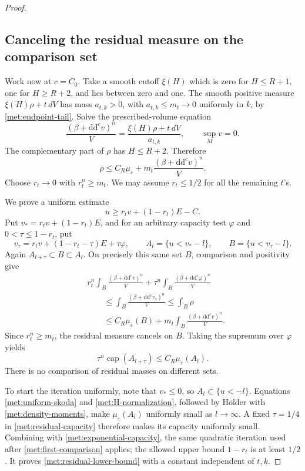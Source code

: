 \documentclass[11pt,letterpaper]{article}
\newcommand{\ddc}{\mathrm{d}\mathrm{d}^{c}}
\theoremstyle{definition}
\theoremstyle{remark}
\begin{document}
\begin{proof}
\subsection*{Canceling the residual measure on the comparison set}

Work now at \(c=C_0\).  Take a smooth cutoff \(\xi(H)\) which is zero
for \(H\leq R+1\), one for \(H\geq R+2\), and lies between zero
and one.  The smooth positive measure
\(\xi(H)\rho+t\,dV\) has mass \(a_{t,k}>0\), with
\(a_{t,k}\leq m_t\to0\) uniformly in \(k\), by
\eqref{met:endpoint-tail}.  Solve the prescribed-volume equation
\cite{YauCalabi}
\[
 \frac{(\beta+\ddc v)^n}{V}
     =\frac{\xi(H)\rho+t\,dV}{a_{t,k}},
 \qquad \sup_Mv=0.
\]
The complementary part of \(\rho\) has \(H\leq R+2\).  Therefore
\begin{equation}
 \label{met:residual-domination}
 \rho\leq C_R\mu_\varepsilon
       +m_t\frac{(\beta+\ddc v)^n}{V}.
\end{equation}
Choose \(r_t\to0\) with \(r_t^n\geq m_t\).  We may assume
\(r_t\leq1/2\) for all the remaining \(t\)'s.

We prove a uniform estimate
\begin{equation}
 \label{met:residual-lower-bound}
 u\geq r_tv+(1-r_t)E-C.
\end{equation}
Put \(v_*=r_tv+(1-r_t)E\), and for an arbitrary capacity test
\(\varphi\) and \(0<\tau\leq1-r_t\), put
\[
 v_\tau=r_tv+(1-r_t-\tau)E+\tau\varphi,
 \qquad A_l=\{u<v_*-l\},
 \qquad B=\{u<v_\tau-l\}.
\]
Again \(A_{l+\tau}\subset B\subset A_l\).  On precisely this
same set \(B\), comparison and positivity give
\begin{align*}
 &r_t^n\int_B\frac{(\beta+\ddc v)^n}{V}
 +\tau^n\int_B\frac{(\beta+\ddc\varphi)^n}{V}\\
 &\qquad\leq\int_B\frac{(\beta+\ddc v_\tau)^n}{V}
 \leq\int_B\rho\\
 &\qquad\leq C_R\mu_\varepsilon(B)
       +m_t\int_B\frac{(\beta+\ddc v)^n}{V}.
\end{align*}
Since \(r_t^n\geq m_t\), the residual measure cancels on \(B\).
Taking the supremum over \(\varphi\) yields
\begin{equation}
 \label{met:residual-capacity}
 \tau^n\operatorname{cap}(A_{l+\tau})
 \leq C_R\mu_\varepsilon(A_l).
\end{equation}
There is no comparison of residual masses on different sets.

To start the iteration uniformly, note that \(v_*\leq0\), so
\(A_l\subset\{u<-l\}\).  Equations
\eqref{met:uniform-skoda} and \eqref{met:H-normalization}, followed
by H\"older with \eqref{met:density-moments}, make
\(\mu_\varepsilon(A_l)\) uniformly small as \(l\to\infty\).
A fixed \(\tau=1/4\) in \eqref{met:residual-capacity} therefore
makes its capacity uniformly small.  Combining with
\eqref{met:exponential-capacity}, the same quadratic iteration used
after \eqref{met:first-comparison} applies; the allowed upper bound
\(1-r_t\) is at least \(1/2\).  It proves
\eqref{met:residual-lower-bound} with a constant independent of
\(t,k\).


\end{proof}
\end{document}

